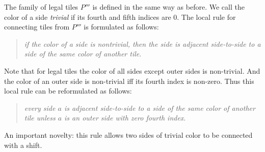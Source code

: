 \documentclass[12pt]{article}
\theoremstyle{remark}
\begin{document}
The family of legal tiles $P'''$ is defined in the same way as before.
We call the color of a side \emph{trivial} if its fourth and fifth indices are $0$.
The local rule for connecting tiles from $P'''$ is formulated as follows:
\begin{quote}
\emph{if the color of a side is nontrivial, 
then the side is adjacent side-to-side to a side of the same color of another tile}.
\end{quote}
Note that for legal tiles the color of all sides except outer sides
is non-trivial. And the color of an outer side is non-trivial iff its fourth
index is non-zero. Thus this local rule can be reformulated as follows: 
\begin{quote}
\emph{every side $a$ is adjacent side-to-side to a side of the same color of another tile
unless $a$ is an outer side with zero fourth index}.
\end{quote}
An important novelty: this rule allows two sides of trivial color to be connected with a shift.
\end{document}
